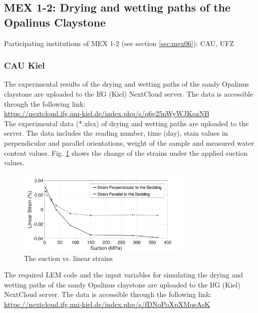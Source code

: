 \subsection{MEX 1-2: Drying and wetting paths of the Opalinus Claystone}

Participating institutions of MEX 1-2 (see section \ref{sec:mex06}): CAU, UFZ

\subsubsection*{CAU Kiel}

The experimental results of the drying and wetting paths of the sandy Opalinus claystone are uploaded to the IfG (Kiel) NextCloud server. The data is accessible through the following link:\\
\hyperlink{https://nextcloud.ifg.uni-kiel.de/index.php/s/q6g25nWyWJKqzNB}{https://nextcloud.ifg.uni-kiel.de/index.php/s/q6g25nWyWJKqzNB}\\

The experimental data (*.xlsx) of drying and wetting paths are uploaded to the server. The data includes the reading number, time (day), stain values in perpendicular and parallel orientations, weight of the sample and measured water content values. Fig. \ref{fig:Amir_ME6_Strain_Data} shows the change of the strains under the applied suction values.

\begin{figure}[!ht]
\centering
\includegraphics[width=0.75\textwidth]{figures/Amir_ME6_Strain_Data.png}
\caption{The suction vs. linear strains}
\label{fig:Amir_ME6_Strain_Data}
\end{figure}

The required LEM code and the input variables for simulating the drying and wetting paths of the sandy Opalinus claystone are uploaded to the IfG (Kiel) NextCloud server. The data is accessible through the following link:\\
\hyperlink{https://nextcloud.ifg.uni-kiel.de/index.php/s/fDNoPoXpXMqeAsK}{https://nextcloud.ifg.uni-kiel.de/index.php/s/fDNoPoXpXMqeAsK}\\

